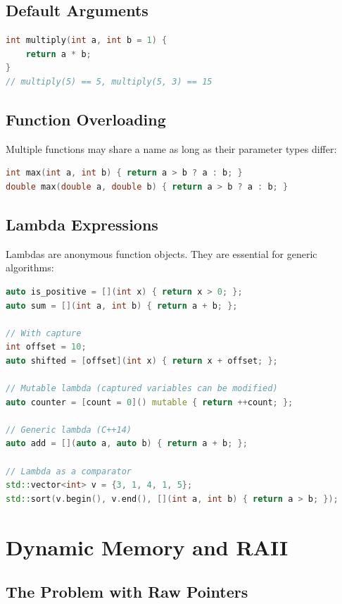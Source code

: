 \subsection{Default Arguments}

\begin{lstlisting}[language=C++]
int multiply(int a, int b = 1) {
    return a * b;
}
// multiply(5) == 5, multiply(5, 3) == 15
\end{lstlisting}

\subsection{Function Overloading}

Multiple functions may share a name as long as their parameter types differ:

\begin{lstlisting}[language=C++]
int max(int a, int b) { return a > b ? a : b; }
double max(double a, double b) { return a > b ? a : b; }
\end{lstlisting}

\subsection{Lambda Expressions}

Lambdas are anonymous function objects. They are essential for generic algorithms:

\begin{lstlisting}[language=C++]
auto is_positive = [](int x) { return x > 0; };
auto sum = [](int a, int b) { return a + b; };

// With capture
int offset = 10;
auto shifted = [offset](int x) { return x + offset; };

// Mutable lambda (captured variables can be modified)
auto counter = [count = 0]() mutable { return ++count; };

// Generic lambda (C++14)
auto add = [](auto a, auto b) { return a + b; };

// Lambda as a comparator
std::vector<int> v = {3, 1, 4, 1, 5};
std::sort(v.begin(), v.end(), [](int a, int b) { return a > b; });
\end{lstlisting}

\section{Dynamic Memory and RAII}

\subsection{The Problem with Raw Pointers}

